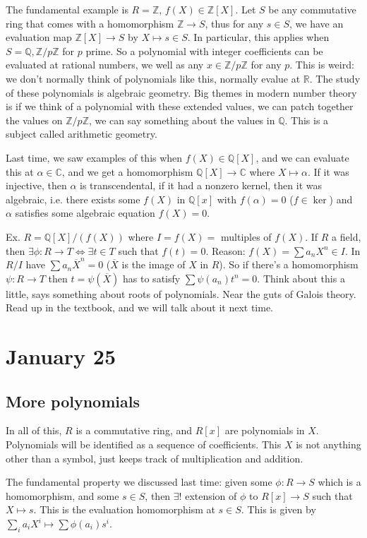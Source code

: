 \documentclass{article}
\theoremstyle{plain}
\theoremstyle{remark}
\newcommand{\Z}{{\mathbb Z}}
\newcommand{\Q}{{\mathbb Q}}
\newcommand{\R}{{\mathbb R}}
\newcommand{\C}{{\mathbb C}}
\begin{document}
The fundamental example is $R = \Z$, $f(X) \in \Z[X]$.
Let $S$ be any commutative ring that comes with a homomorphism $\Z \to S$,
thus for any $s \in S$, we have an evaluation map $\Z[X] \to S$
by $X \mapsto s \in S$.
In particular, this applies when $S = \Q, \Z/p\Z$ for $p$ prime.
So a polynomial with integer coefficients can be evaluated at rational numbers,
we well as any $x \in \Z/p\Z$ for any $p$.
This is weird: we don't normally think of polynomials like this,
normally evalue at $\R$.
The study of these polynomials is algebraic geometry.
Big themes in modern number theory is if we think of a polynomial with these extended values,
we can patch together the values on $\Z/p\Z$, we can say something about the values in $\Q$.
This is a subject called arithmetic geometry.

Last time, we saw examples of this when $f(X) \in \Q[X]$,
and we can evaluate this at $\alpha \in \C$,
and we get a homomorphism $\Q[X] \to \C$ where $X \mapsto \alpha$.
If it was injective, then $\alpha$ is transcendental,
if it had a nonzero kernel, then it was algebraic,
i.e. there exists some $f(X)$ in $\Q[x]$ with $f(\alpha) = 0$ ($f \in \ker$)
and $\alpha$ satisfies some algebraic equation $f(X) = 0$.

Ex. $R = \Q[X]/(f(X))$ where $I = f(X) =$ multiples of $f(X)$.
If $R$ a field, then $\exists \phi \colon R \to T \iff
\exists t \in T$ such that $f(t) = 0$.
Reason: $f(X) = \sum a_nX^n \in I$.
In $R/I$ have $\sum a_n \overline{X}^n = 0$
($\overline{X}$ is the image of $X$ in $R$).
So if there's a homomorphism $\psi \colon R \to T$
then $t = \psi(\overline{X})$ has to satisfy $\sum \psi(a_n)t^n = 0$.
Think about this a little, says something about roots of polynomials.
Near the guts of Galois theory.
Read up in the textbook, and we will talk about it next time.

\section{January 25}
\subsection{More polynomials}
In all of this, $R$ is a commutative ring, and $R[x]$ are polynomials in $X$.
Polynomials will be identified as a sequence of coefficients.
This $X$ is not anything other than a symbol,
just keeps track of multiplication and addition.

The fundamental property we discussed last time:
given some $\phi \colon R \to S$ which is a homomorphism,
and some $s \in S$, then $\exists!$ extension of $\phi$ to $R[x] \to S$
such that $X \mapsto s$.
This is the evaluation homomorphism at $s \in S$.
This is given by $\sum_i a_i X^i \mapsto \sum \phi(a_i)s^i$.
\end{document}
